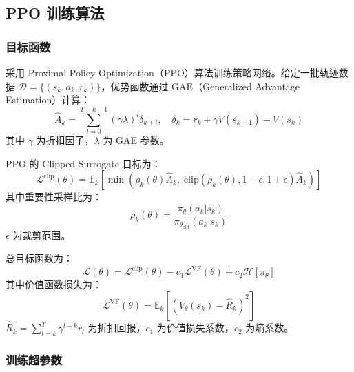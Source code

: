 \documentclass[11pt]{ctexart}
\begin{document}
\subsection{PPO 训练算法}

\subsubsection{目标函数}

采用 Proximal Policy Optimization（PPO）算法训练策略网络。给定一批轨迹数据 $\mathcal{D} = \{(s_k, a_k, r_k)\}$，优势函数通过 GAE（Generalized Advantage Estimation）计算：
\begin{equation}
\hat{A}_k = \sum_{l=0}^{T-k-1} (\gamma \lambda)^l \delta_{k+l}, \quad \delta_k = r_k + \gamma V(s_{k+1}) - V(s_k)
\end{equation}
其中 $\gamma$ 为折扣因子，$\lambda$ 为 GAE 参数。

PPO 的 Clipped Surrogate 目标为：
\begin{equation}
\mathcal{L}^{\text{clip}}(\theta) = \mathbb{E}_k \left[ \min\!\left( \rho_k(\theta) \hat{A}_k, \; \mathrm{clip}\!\left(\rho_k(\theta), 1-\epsilon, 1+\epsilon\right) \hat{A}_k \right) \right]
\end{equation}
其中重要性采样比为：
\begin{equation}
\rho_k(\theta) = \frac{\pi_\theta(a_k | s_k)}{\pi_{\theta_{\text{old}}}(a_k | s_k)}
\end{equation}
$\epsilon$ 为裁剪范围。

总目标函数为：
\begin{equation}
\mathcal{L}(\theta) = \mathcal{L}^{\text{clip}}(\theta) - c_1 \mathcal{L}^{\text{VF}}(\theta) + c_2 \mathcal{H}\!\left[\pi_\theta\right]
\end{equation}
其中价值函数损失为：
\begin{equation}
\mathcal{L}^{\text{VF}}(\theta) = \mathbb{E}_k \left[ \left(V_\theta(s_k) - \hat{R}_k\right)^2 \right]
\end{equation}
$\hat{R}_k = \sum_{l=k}^{T} \gamma^{l-k} r_l$ 为折扣回报，$c_1$ 为价值损失系数，$c_2$ 为熵系数。

\subsubsection{训练超参数}
\end{document}
